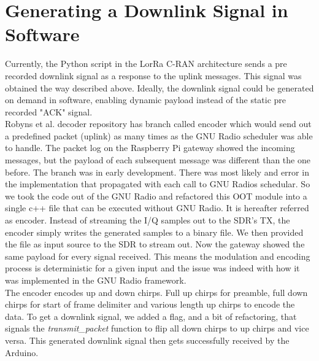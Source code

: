 \section{Generating a Downlink Signal in Software}
Currently, the Python script in the LorRa C-RAN architecture sends a pre recorded downlink signal as a response to the uplink messages.
This signal was obtained the way described above. Ideally, the downlink signal could be generated on demand in software, enabling dynamic 
payload instead of the static pre recorded "ACK" signal.\\
Robyns et al. decoder repository has branch called encoder which would send out a predefined packet (uplink) as many times as the GNU Radio scheduler 
was able to handle. The packet log on the Raspberry Pi gateway showed the incoming messages, but the payload of each subsequent message was different 
than the one before. The branch was in early development. There was most likely and error in the implementation that propagated with each call to GNU Radios schedular.
So we took the code out of the GNU Radio and refactored this OOT module into a single c++ file that can be executed without GNU Radio. It is hereafter referred as encoder.
Instead of streaming the I/Q samples out to the SDR's TX, the encoder simply writes the generated samples to a binary file.
We then provided the file as input source to the SDR to stream out. Now the gateway showed the same payload for every signal received. 
This means the modulation and encoding process is deterministic for a given input and the issue was indeed with how it was implemented in the GNU Radio framework.
\\
The encoder encodes up and down chirps. Full up chirps for preamble, full down chirps for start of frame delimiter and various length up chirps to encode the data.
To get a downlink signal, we added a flag, and a bit of refactoring, that signals the \emph{transmit\_packet} function to flip all down chirps to up chirps and vice versa.
This generated downlink signal then gets successfully received by the Arduino. 

